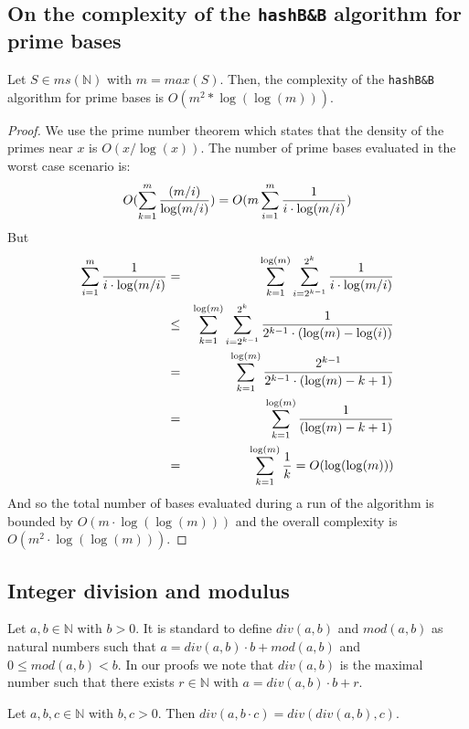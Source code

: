 \documentclass[envcountsame]{llncs}
\newcommand{\intMultiSet}{\mathit{ms(\mathbb{N})}}
\begin{document}
\subsection{On the complexity of the \texttt{hashB\&B} algorithm
  for prime bases}

\begin{theorem}
  Let  $S\in\intMultiSet$ with  $m=max(S)$. Then,
  the complexity of the \texttt{hashB\&B} algorithm for prime bases
  is $O(m^2 * \log(\log(m)))$.
\end{theorem}

\begin{proof}
  We use the prime number theorem which states that the density of the
  primes near $x$ is $O(x/\log(x))$.
  The number of prime bases evaluated in the worst case scenario is: 
  \[O(\sum_{k=1}^{m}{ (m / i) \over \log(m / i)})=
         O(m \sum_{i=1}^{m}{1 \over i \cdot \log(m/i)} )\]
  But 
  \begin{eqnarray*}
    \sum_{i=1}^{m}{1 \over i \cdot  \log(m/i)}&=&
       \sum_{k=1}^{\log(m)}\sum_{i=2^{k-1}}^{2^k}{1 \over i  \cdot \log(m/i)}\\
  &\leq& \sum_{k=1}^{\log(m)}\sum_{i=2^{k-1}}^{2^k}{1 \over 2^{k-1} \cdot( \log(m)- \log(i))}\\
  &=&  \sum_{k=1}^{\log(m)}{2^{k-1} \over 2^{k-1} \cdot( \log(m)- k
    +1)}\\
  &=&  \sum_{k=1}^{\log(m)}{1  \over( \log(m)- k +1)} \\
  &=&\sum_{k=1}^{\log(m)}{1  \over  k}= O(\log(\log(m)))
\end{eqnarray*}
And so the total number of bases evaluated during a run of the
algorithm is bounded by $O(m \cdot \log (\log (m)))$ and the overall
complexity is $O(m^2 \cdot \log(\log(m)))$.
\end{proof}\bigskip


\subsection{Integer division and modulus}
\noindent
Let $a,b\in\mathbb{N}$ with $b>0$. It is standard to define
$div(a,b)$ and $mod(a,b)$ as natural numbers such that $a = div(a,b)
\cdot b + mod(a,b)$ and $0\leq mod(a,b)< b$. In our proofs we note
that $div(a,b)$ is the maximal number such that there exists $r \in
\mathbb{N}$ with $a= div(a,b)\cdot b + r$.






\begin{proposition}
\label{pDiv} 
Let  $a,b,c\in\mathbb{N}$ with $b,c>0$. Then $div(a,b\cdot c) =
div(div(a,b),c)$.
\end{proposition}
\end{document}
